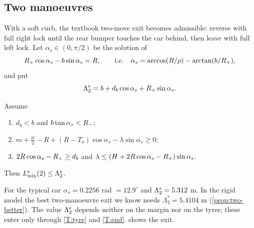 \subsection{Two manoeuvres}
With a soft curb, the textbook two-move exit becomes admissible: reverse with full right lock until the rear bumper touches the car behind, then leave with full left lock.
Let $\alpha_s\in(0,\pi/2)$ be the solution of
\[
  R_{+}\cos\alpha_s-b\sin\alpha_s=R,\qquad\text{i.e.}\quad \alpha_s=\arccos(R/\rho)-\arctan(b/R_{+}),
\]
and put
\[
  \Lambda_2^{\rm s}=b+d_b\cos\alpha_s+R_{+}\sin\alpha_s .
\]

\begin{proposition}\label{prop:two-soft}
Assume
\begin{enumerate}[label=(T\arabic*),nosep]
\item\label{T:db} $d_b<b$ and $b\tan\alpha_s<R_{-}$;
\item\label{T:tyre} $m+\tfrac w2-R+(R-T_o)\cos\alpha_s-\lambda\sin\alpha_s\ge0$;
\item\label{T:end} $2R\cos\alpha_s-R_{+}\ge d_b$ and $\lambda\le(H+2R\cos\alpha_s-R_{+})\sin\alpha_s$.
\end{enumerate}
Then $L^{\mathrm s}_{\min}(2)\le\Lambda_2^{\rm s}$.
\end{proposition}

For the typical car $\alpha_s=0.2256$ rad $=12.9^\circ$ and $\Lambda_2^{\rm s}=5.312$ m.
In the rigid model the best two-manoeuvre exit we know needs $\Lambda_2^*=5.4104$ m (\cref{prop:two-better}).
The value $\Lambda_2^{\rm s}$ depends neither on the margin nor on the tyres; these enter only through \ref{T:tyre} and \ref{T:end}.
 shows the exit.

